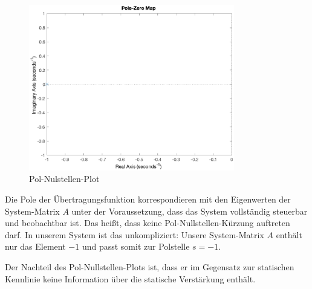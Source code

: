 \begin{figure}[H]
    \centering
    \includegraphics[width=0.8\textwidth]{Bilder/PoleZeroPT1Tt.eps}
    \caption{Pol-Nulstellen-Plot}
 \end{figure}

 Die Pole der Übertragungsfunktion korrespondieren mit den Eigenwerten der System-Matrix $A$ unter der Voraussetzung, dass das System vollständig steuerbar und beobachtbar ist.
 Das heißt, dass keine Pol-Nullstellen-Kürzung auftreten darf.
 In unserem System ist das unkompliziert: Unsere System-Matrix $A$ enthält nur das Element $-1$ und passt somit zur Polstelle $s = -1$.

 Der Nachteil des Pol-Nullstellen-Plots ist, dass er im Gegensatz zur statischen Kennlinie keine Information über die statische Verstärkung enthält.


